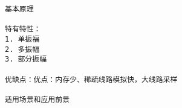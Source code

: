 \begin{lstlisting}
基本原理

特有特性：
1. 单振福
2. 多振幅
3. 部分振幅

优缺点：优点：内存少、稀疏线路模拟快，大线路采样

适用场景和应用前景
\end{lstlisting}